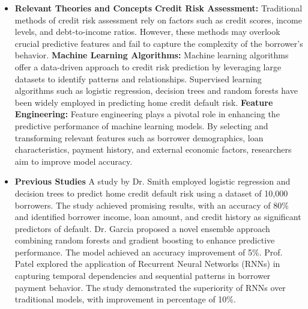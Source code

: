 \documentclass{josis}
\begin{document}
\begin{itemize}
\item \textbf{Relevant Theories and Concepts}
\newline\textbf{Credit Risk Assessment:} Traditional methods of credit risk assessment rely on factors such as credit scores, income levels, and debt-to-income ratios. However, these methods may overlook crucial predictive features and fail to capture the complexity of the borrower's behavior.
\newline\textbf{Machine Learning Algorithms:} Machine learning algorithms offer a data-driven approach to credit risk prediction by leveraging large datasets to identify patterns and relationships. Supervised learning algorithms such as logistic regression, decision trees and random forests have been widely employed in predicting home credit default risk.
\newline\textbf{Feature Engineering:} Feature engineering plays a pivotal role in enhancing the predictive performance of machine learning models. By selecting and transforming relevant features such as borrower demographics, loan characteristics, payment history, and external economic factors, researchers aim to improve model accuracy.
\end{itemize}

\begin{itemize}
\item\textbf{Previous Studies}
\newline A study by Dr. Smith employed logistic regression and decision trees to predict home credit default risk using a dataset of 10,000 borrowers. The study achieved promising results, with an accuracy of 80\% and identified borrower income, loan amount, and credit history as significant predictors of default.
\newline Dr. Garcia proposed a novel ensemble approach combining random forests and gradient boosting to enhance predictive performance. The model achieved an accuracy improvement of 5\%.
\newline Prof. Patel explored the application of Recurrent Neural Networks (RNNs) in capturing temporal dependencies and sequential patterns in borrower payment behavior. The study demonstrated the superiority of RNNs over traditional models, with improvement in percentage of 10\%.
\end{itemize}
\end{document}
